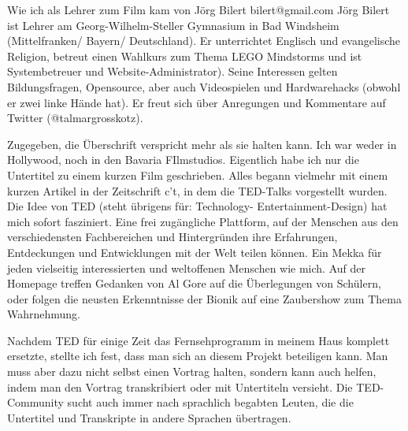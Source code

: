 ﻿Wie ich als Lehrer zum Film kam
von Jörg Bilert bilert@gmail.com
Jörg Bilert ist Lehrer am Georg-Wilhelm-Steller Gymnasium in Bad Windsheim (Mittelfranken/ Bayern/ Deutschland). Er unterrichtet Englisch und evangelische Religion, betreut einen Wahlkurs zum Thema LEGO Mindstorms und ist Systembetreuer und Website-Administrator). Seine Interessen gelten Bildungsfragen, Opensource, aber auch Videospielen und Hardwarehacks (obwohl er zwei linke Hände hat). Er freut sich über Anregungen und Kommentare auf Twitter (@talmargrosskotz).


Zugegeben, die Überschrift verspricht mehr als sie halten kann. Ich war weder in Hollywood, noch in den Bavaria FIlmstudios. Eigentlich habe ich nur die Untertitel zu einem kurzen Film geschrieben. Alles begann vielmehr mit einem kurzen Artikel in der Zeitschrift c’t, in dem die TED-Talks vorgestellt wurden. Die Idee von TED (steht übrigens für: Technology- Entertainment-Design) hat mich sofort fasziniert. Eine frei zugängliche Plattform, auf der Menschen aus den verschiedensten Fachbereichen und Hintergründen ihre Erfahrungen, Entdeckungen und Entwicklungen mit der Welt teilen können. Ein Mekka für jeden vielseitig interessierten und weltoffenen Menschen wie mich. Auf der Homepage treffen Gedanken von Al Gore auf die Überlegungen von Schülern, oder folgen die neusten Erkenntnisse der Bionik auf eine Zaubershow zum Thema Wahrnehmung.


Nachdem TED für einige Zeit das Fernsehprogramm in meinem Haus komplett ersetzte, stellte ich fest, dass man sich an diesem Projekt beteiligen kann. Man muss aber dazu nicht selbst einen Vortrag halten, sondern kann auch helfen, indem man den Vortrag transkribiert oder mit Untertiteln versieht. Die TED-Community sucht auch immer nach sprachlich begabten Leuten, die die Untertitel und Transkripte in andere Sprachen übertragen.


